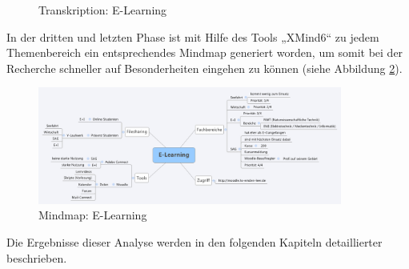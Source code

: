 \begin{figure}[h!]
	\centering
	\caption{Transkription: E-Learning}
	\label{fig_E-Learning_Transkription}
\end{figure}

In der dritten und letzten Phase ist mit Hilfe des Tools „XMind6“ zu jedem Themenbereich ein entsprechendes Mindmap generiert worden, um somit bei der Recherche schneller auf Besonderheiten eingehen zu können  (siehe Abbildung \ref{fig_E-Learning_MM}).

\begin{figure}[h!]
	\centering
	\includegraphics[width=10cm]{kapitel/gruppe2/bilder/E-Learning_MM}
	\caption{Mindmap: E-Learning}
	\label{fig_E-Learning_MM}
\end{figure}

Die Ergebnisse dieser Analyse werden in den folgenden Kapiteln detaillierter beschrieben. 